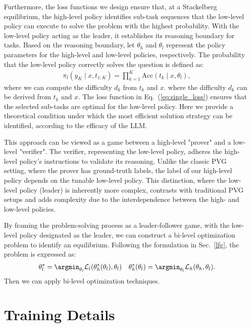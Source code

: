 Furthermore, the loss functions we design ensure that, at a Stackelberg equilibrium, the high-level policy identifies sub-task sequences that the low-level policy can execute to solve the problem with the highest probability. With the low-level policy acting as the leader, it establishes its reasoning boundary for tasks. Based on the reasoning boundary, let $\theta_h$ and $\theta_l$ represent the policy parameters for the high-level and low-level policies, respectively. The probability that the low-level policy correctly solves the question is defined as:
\begin{align*}
    \pi_l(y_K \mid x, t_{1:K}) = \prod_{k=1}^K \text{Acc}(t_k \mid x, \theta_l),
\end{align*}
where we can compute the difficulty $d_k$ from $t_k$ and $x$.
where the difficulty $d_k$ can be derived from $t_k$ and $x$. The loss function in Eq.~(\ref{eq:single_loss}) ensures that the selected sub-tasks are optimal for the low-level policy.  Here we provide a theoretical condition under which the most efficient solution strategy can be identified, according to the efficacy of the LLM.

This approach can be viewed as a game between a high-level "prover" and a low-level "verifier". The verifier, representing the low-level policy, adheres the high-level policy’s instructions to validate its reasoning. Unlike the classic PVG setting, where the prover has ground-truth labels, the label of our high-level policy depends on the tunable low-level policy. This distinction, where the low-level policy (leader) is inherently more complex, contrasts with traditional PVG setups and adds complexity due to the interdependence between the high- and low-level policies.

By framing the problem-solving process as a leader-follower game, with the low-level policy designated as the leader, we can construct a bi-level optimization problem to identify an equilibrium. Following the formulation in Sec.~\ref{lfg}, the problem is expressed as:
\begin{align*}
    \theta_l^* = \argmin_{\theta_l} \mathcal{L}_l(\theta_h^*(\theta_l), \theta_l) \quad \theta_h^*(\theta_l) = \argmin_{\theta_l}\mathcal{L}_h(\theta_h, \theta_l).
\end{align*}
Then we can apply bi-level optimization techniques. 

\section{Training Details}
\label{app:exp_setting}

